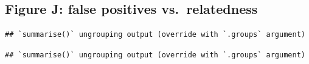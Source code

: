 \documentclass[
]{article}
\newenvironment{Shaded}{\begin{snugshade}}{\end{snugshade}}
\newcommand{\CommentTok}[1]{\textcolor[rgb]{0.56,0.35,0.01}{\textit{#1}}}
\newcommand{\DataTypeTok}[1]{\textcolor[rgb]{0.13,0.29,0.53}{#1}}
\newcommand{\KeywordTok}[1]{\textcolor[rgb]{0.13,0.29,0.53}{\textbf{#1}}}
\newcommand{\NormalTok}[1]{#1}
\newcommand{\OperatorTok}[1]{\textcolor[rgb]{0.81,0.36,0.00}{\textbf{#1}}}
\newcommand{\StringTok}[1]{\textcolor[rgb]{0.31,0.60,0.02}{#1}}
\begin{document}
\hypertarget{figure-j-false-positives-vs.-relatedness}{%
\subsection{Figure J: false positives
vs.~relatedness}\label{figure-j-false-positives-vs.-relatedness}}

\begin{Shaded}
\end{Shaded}

\begin{verbatim}
## `summarise()` ungrouping output (override with `.groups` argument)
\end{verbatim}

\begin{Shaded}
\end{Shaded}

\begin{verbatim}
## `summarise()` ungrouping output (override with `.groups` argument)
\end{verbatim}
\end{document}
